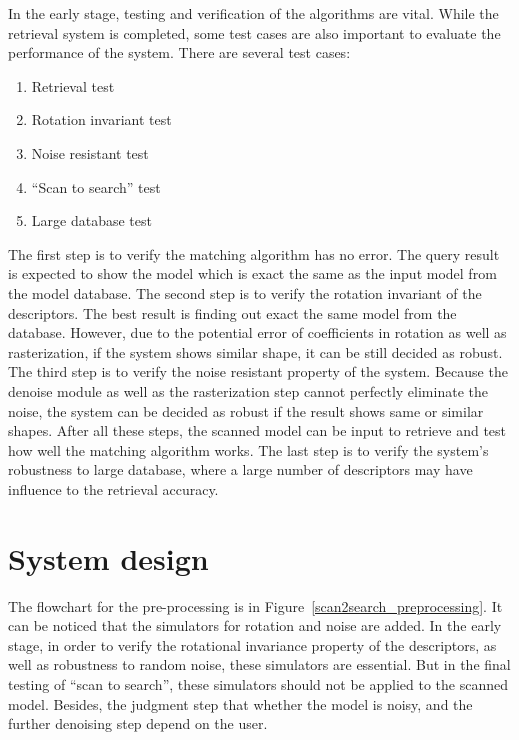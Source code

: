 In the early stage, testing and verification of the algorithms are vital. While the retrieval system is completed, some test cases are also important to evaluate the performance of the system. There are several test cases: 

\begin{enumerate}[1.]
\item Retrieval test
\item Rotation invariant test
\item Noise resistant test
\item ``Scan to search'' test
\item Large database test
\end{enumerate}

The first step is to verify the matching algorithm has no error. The query result is expected to show the model which is exact the same as the input model from the model database. The second step is to verify the rotation invariant of the descriptors. The best result is finding out exact the same model from the database. However, due to the potential error of coefficients in rotation as well as rasterization, if the system shows similar shape, it can be still decided as robust. The third step is to verify the noise resistant property of the system. Because the denoise module as well as the rasterization step cannot perfectly eliminate the noise, the system can be decided as robust if the result shows same or similar shapes. After all these steps, the scanned model can be input to retrieve and test how well the matching algorithm works. The last step is to verify the system's robustness to large database, where a large number of descriptors may have influence to the retrieval accuracy. 

\section{System design}

The flowchart for the pre-processing is in Figure~\ref{scan2search_preprocessing}. It can be noticed that the simulators for rotation and noise are added. In the early stage, in order to verify the rotational invariance property of the descriptors, as well as robustness to random noise, these simulators are essential. But in the final testing of ``scan to search'', these simulators should not be applied to the scanned model. Besides, the judgment step that whether the model is noisy, and the further denoising step depend on the user. 

